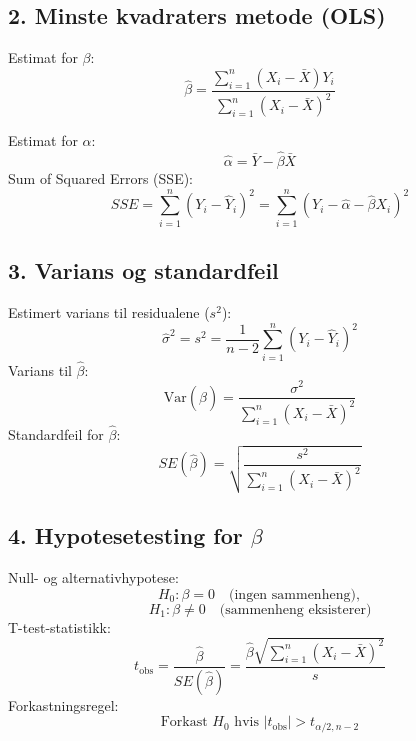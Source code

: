 \documentclass[a4paper,7pt,fleqn]{article}
\begin{document}
\begin{multicols}{2}
\begin{minipage}{\linewidth}
    \subsection*{2. Minste kvadraters metode (OLS)}
    Estimat for \(\beta\):
    \[
    \hat{\beta} = \frac{\sum_{i=1}^n (X_i - \bar{X}) Y_i}{\sum_{i=1}^n (X_i - \bar{X})^2}
    \]
    
    
    
    Estimat for \(\alpha\):
    \[
    \hat{\alpha} = \bar{Y} - \hat{\beta} \bar{X}
    \]
    Sum of Squared Errors (SSE):
    \[
    SSE = \sum_{i=1}^n \left(Y_i - \hat{Y}_i\right)^2 = \sum_{i=1}^n \left(Y_i - \hat{\alpha} - \hat{\beta} X_i\right)^2
    \]
    
    \end{minipage}
    \begin{minipage}{\linewidth}
    
    \subsection*{3. Varians og standardfeil}
    Estimert varians til residualene (\(s^2\)):
    \[
    \hat{\sigma}^2 = s^2 = \frac{1}{n-2} \sum_{i=1}^n \left(Y_i - \hat{Y}_i\right)^2
    \]
    Varians til \(\hat{\beta}\):
    \[
    \text{Var}(\hat{\beta}) = \frac{\sigma^2}{\sum_{i=1}^n (X_i - \bar{X})^2}
    \]
    Standardfeil for \(\hat{\beta}\):
    \[
    SE(\hat{\beta}) = \sqrt{\frac{s^2}{\sum_{i=1}^n (X_i - \bar{X})^2}}
    \]
    
    \end{minipage}
    \begin{minipage}{\linewidth}
    
    \subsection*{4. Hypotesetesting for \(\beta\)}
    Null- og alternativhypotese:
    \[
    H_0: \beta = 0 \quad \text{(ingen sammenheng)}, 
    \]
    \[
    H_1: \beta \neq 0 \quad \text{(sammenheng eksisterer)}
    \]
    T-test-statistikk:
    \[
    t_{\text{obs}} = \frac{\hat{\beta}}{SE(\hat{\beta})} = \frac{\hat{\beta} \sqrt{\sum_{i=1}^n (X_i - \bar{X})^2}}{s}
    \]
    Forkastningsregel:
    \[
    \text{Forkast } H_0 \text{ hvis } |t_{\text{obs}}| > t_{\alpha/2, n-2}
    \]
    
    \end{minipage}
    \begin{minipage}{\linewidth}
    

\end{minipage}
\end{multicols}
\end{document}
